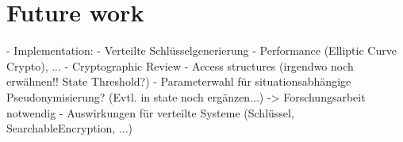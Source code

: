 \section{Future work}

- Implementation:
  - Verteilte Schlüsselgenerierung
  - Performance (Elliptic Curve Crypto), ...
  - Cryptographic Review
  - Access structures (irgendwo noch erwähnen!! State Threshold?)
- Parameterwahl für situationsabhängige Pseudonymisierung? (Evtl. in state noch ergänzen...) -> Forschungsarbeit notwendig
- Auswirkungen für verteilte Systeme (Schlüssel, SearchableEncryption, ...)
